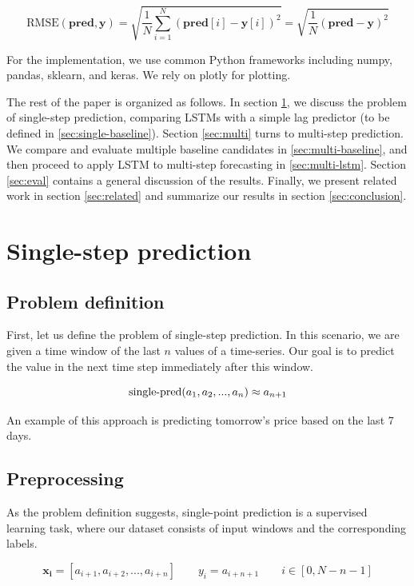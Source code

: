 \documentclass{article}
\begin{document}
$$\textrm{RMSE}(\mathbf{pred}, \mathbf{y}) = \sqrt{\frac1N \sum_{i=1}^{N} {(\mathbf{pred}[i] - \mathbf{y}[i])^2}} = \sqrt{\frac1N (\mathbf{pred} - \mathbf{y})^2}$$

For the implementation, we use common Python frameworks including numpy, pandas, sklearn, and keras. We rely on plotly for plotting.

The rest of the paper is organized as follows. In section \ref{sec:single}, we discuss the problem of single-step prediction, comparing LSTMs with a simple lag predictor (to be defined in \ref{sec:single-baseline}). Section \ref{sec:multi} turns to multi-step prediction. We compare and evaluate multiple baseline candidates in \ref{sec:multi-baseline}, and then proceed to apply LSTM to multi-step forecasting in \ref{sec:multi-lstm}. Section \ref{sec:eval} contains a general discussion of the results. Finally, we present related work in section \ref{sec:related} and summarize our results in section \ref{sec:conclusion}.


\section{Single-step prediction}
\label{sec:single}

\subsection{Problem definition}

First, let us define the problem of single-step prediction. In this scenario, we are given a time window of the last $n$ values of a time-series. Our goal is to predict the value in the next time step immediately after this window.

$$\textrm{single\textnormal{-}pred}(a_1, a_2, ..., a_n) \approx a_{n+1}$$

An example of this approach is predicting tomorrow's price based on the last 7 days.

\subsection{Preprocessing}

As the problem definition suggests, single-point prediction is a supervised learning task, where our dataset consists of input windows and the corresponding labels.

$$\mathbf{x_i} = [a_{i+1}, a_{i+2}, ..., a_{i+n}] \hspace{2em} y_i = a_{i+n+1} \hspace{2em} i \in [0,N-n-1]$$
\end{document}
